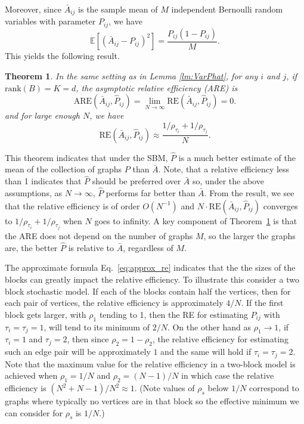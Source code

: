 \documentclass[10pt,letterpaper]{article}
\newtheorem{theorem}[fact]{Theorem}
\newcommand{\Ex}{\mathbb{E}}
\begin{document}
Moreover, since $\bar{A}_{ij}$ is the sample mean of $M$ independent Bernoulli random variables with parameter $P_{ij}$, we have
\[
    \Ex[(\bar{A}_{ij} - P_{ij})^2] = \frac{P_{ij}(1-P_{ij})}{M}.
\]
This yields the following result.
\begin{theorem}
\label{thm:ARE}
In the same setting as in Lemma \ref{lm:VarPhat}, for any $i$ and $j$, if $\mathrm{rank}(B)=K=d$, the asymptotic relative efficiency (ARE) is 
\[
    \mathrm{ARE}(\bar{A}_{ij}, \hat{P}_{ij}) = \lim_{N \to \infty} \mathrm{RE}(\bar{A}_{ij}, \hat{P}_{ij}) = 0.
    \label{eq:sbm_are}
\]
and for large enough $N$, we have
\begin{equation}
	    \mathrm{RE}(\bar{A}_{ij}, \hat{P}_{ij}) \approx
    \frac{1/\rho_{\tau_i} + 1/\rho_{\tau_j}}{N}.
\label{eq:approx_re}
\end{equation}
\end{theorem}


This theorem indicates that under the SBM, $\hat{P}$ is a much better estimate of the mean of the collection of graphs $P$ than $\bar{A}$.
Note, that a relative efficiency less than 1 indicates that $\hat{P}$ should be preferred over $\bar{A}$ so, under the above assumptions, as $N\to\infty$, $\hat{P}$ performs far better than $\bar{A}$.
From the result, we see that the relative efficiency is of order $O(N^{-1})$ and $N \cdot \mathrm{RE}(\bar{A}_{ij}, \hat{P}_{ij})$ converges to $1/\rho_{\tau_i}+1/\rho_{\tau_j}$ when $N$ goes to infinity.
A key component of Theorem~\ref{thm:ARE} is that the ARE does not depend on the number of graphs $M$, so the larger the graphs are, the better $\hat{P}$ is relative to $\bar{A}$, regardless of $M$.

The approximate formula Eq.~\ref{eq:approx_re} indicates that the the sizes of the blocks can greatly impact the relative efficiency.
To illustrate this consider a two block stochastic model. 
If each of the blocks contain half the vertices, then for each pair of vertices, the relative efficiency is approximately $4/N$. 
If the first block gets larger, with $\rho_1$ tending to 1, then the RE for estimating $P_{ij}$ with $\tau_i=\tau_j=1$, will tend to its minimum of $2/N$. 
On the other hand as $\rho_1\to 1$, if $\tau_i=1$ and $\tau_j=2$, then since $\rho_2=1-\rho_2$, the relative efficiency for estimating such an edge pair will be approximately $1$ and the same will hold if $\tau_i=\tau_j=2$.
Note that the maximum value for the relative efficiency in a two-block model is achieved when $\rho_1=1/N$ and $\rho_2=(N-1)/N$ in which case the relative efficiency is $(N^2+N-1)/N^2\approx 1$.
(Note values of $\rho_s$ below $1/N$ correspond to graphs where typically no vertices are in that block so the effective minimum we can consider for $\rho_s$ is $1/N$.)
\end{document}
